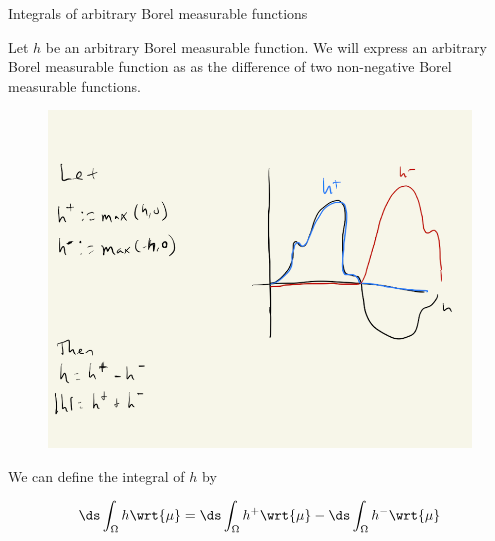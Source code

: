 \documentclass[10pt]{beamer}
\begin{document}
\begin{frame}{Integrals of arbitrary Borel measurable functions}

Let $h$ be an arbitrary Borel measurable function.   We will express an arbitrary Borel measurable function as as the difference of two non-negative Borel measurable functions.


\begin{figure}[H]
\centering
\includegraphics[width=.4\textwidth]{images/arbitrary_borel_measurable_functions_in_terms_of_nonnegative_borel_measurable_functions}
\end{figure}

We can define the integral of $h$ by 

\[ \ds\int_\Omega h \wrt{\mu} = \ds\int_\Omega h^+ \wrt{\mu} - \ds\int_\Omega h^- \wrt{\mu} \]

\vfill


\end{frame}

\end{document}
